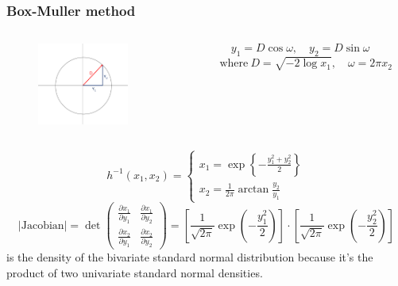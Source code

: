 \documentclass[10pt, serif, mathserif]{beamer}
\begin{document}
\begin{frame}
  \frametitle{Box-Muller method}
  \begin{columns}
    \begin{column}{3cm}
      \begin{figure}
        \centering
        \includegraphics[width=3cm]{Picture1.png}
      \end{figure}
    \end{column}

    \begin{column}{5cm}
      \[ y_1 = D \cos \omega, \quad y_2 = D \sin \omega \quad \]
      \[ \text{where}\ D = \sqrt{-2 \log x_1}, \quad \omega = 2\pi x_2 \]
    \end{column}
  \end{columns}

  \bigskip
  
  \bigskip
  
  \[
    h^{-1}(x_1,x_2) = \begin{cases}
      x_1 = \exp{\left\{ -\frac{y_1^2 + y_2^2}{2} \right\}}       
      \\
      x_2 = \frac{1}{2\pi} \arctan \frac{y_2}{y_1}
    \end{cases}
  \]
  \[
  	|\text{Jacobian}| = \det \left(
  	  \begin{matrix}
  	    \frac{\partial x_1}{\partial y_1} & \frac{\partial x_1}{\partial y_2} \\
  	    \frac{\partial x_2}{\partial y_1} & \frac{\partial x_2}{\partial y_2} 
  	  \end{matrix}
  	\right) = 
  	\left[ 
  	  \frac{1}{\sqrt{2\pi}} \exp{\left(-\frac{y_1^2}{2}\right)}
  	\right]
  	\cdot
  	\left[
  	  \frac{1}{\sqrt{2\pi}} \exp{\left(-\frac{y_2^2}{2}\right)} 
  	\right]
  \]
  is the density of the bivariate standard normal distribution because it's the product of two univariate standard normal densities.
\end{frame}
\end{document}
